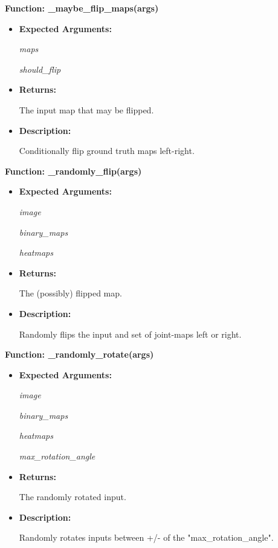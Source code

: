 \documentclass{scrreprt}
\begin{document}
\textbf{Function: \_maybe\_flip\_maps(args)}
\begin{itemize}
    \item \textbf{Expected Arguments:}

            \quad\textit{maps}

            \quad\textit{should\_flip}

    \item \textbf{Returns:}

            The input map that may be flipped.

    \item \textbf{Description:}

            Conditionally flip ground truth maps left-right.

\end{itemize}

\textbf{Function: \_randomly\_flip(args)}
\begin{itemize}
    \item \textbf{Expected Arguments:}

            \quad\textit{image}

            \quad\textit{binary\_maps}

            \quad\textit{heatmaps}

    \item \textbf{Returns:}

            The (possibly) flipped map.

    \item \textbf{Description:}

            Randomly flips the input and set of joint-maps left or right.

\end{itemize}

\textbf{Function: \_randomly\_rotate(args)}
\begin{itemize}
    \item \textbf{Expected Arguments:}

            \quad\textit{image}

            \quad\textit{binary\_maps}

            \quad\textit{heatmaps}

            \quad\textit{max\_rotation\_angle}

    \item \textbf{Returns:}

            The randomly rotated input.

    \item \textbf{Description:}

            Randomly rotates inputs between +/- of the "max\_rotation\_angle".

\end{itemize}
\end{document}
